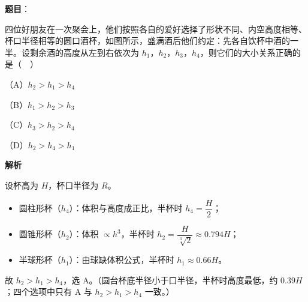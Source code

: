 \begin{answer}

\textbf{题目}：

四位好朋友在一次聚会上，他们按照各自的爱好选择了形状不同、内空高度相等、杯口半径相等的圆口酒杯，如图所示，盛满酒后他们约定：先各自饮杯中酒的一半。设剩余酒的高度从左到右依次为 $h_1$，$h_2$，$h_3$，$h_4$，则它们的大小关系正确的是（　）
\nopagebreak[4]
\begin{center}\end{center}
\nopagebreak[4]
（A）$h_2>h_1>h_4$

（B）$h_1>h_2>h_3$

（C）$h_3>h_2>h_4$

（D）$h_2>h_4>h_1$

\textbf{解析}

设杯高为 $H$，杯口半径为 $R$。

\begin{itemize}
\item 圆柱形杯（$h_4$）：体积与高度成正比，半杯时 $h_4=\dfrac H2$；
\item 圆锥形杯（$h_2$）：体积 $\propto h^3$，半杯时 $h_2=\dfrac{H}{\sqrt[3]{2}}\approx0.794H$；
\item 半球形杯（$h_1$）：由球缺体积公式，半杯时 $h_1\approx0.66H$。
\end{itemize}

故 $h_2>h_1>h_4$，选 A。（圆台杯底半径小于口半径，半杯时高度最低，约 $0.39H$；四个选项中只有 A 与 $h_2>h_1>h_4$ 一致。）


\end{answer}
